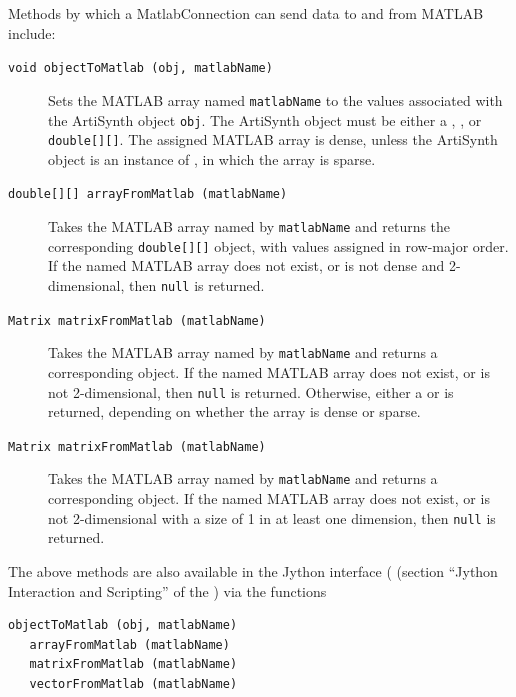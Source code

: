 \documentclass{article}
\begin{document}
Methods by which a MatlabConnection can send data to and from MATLAB
include:

\begin{description}

\item[{\tt void objectToMatlab (obj, matlabName)} ] \mbox{}

Sets the MATLAB array named {\tt matlabName} to the values associated
with the ArtiSynth object {\tt obj}. The ArtiSynth object must be
either a ,
, or {\tt double[][]}.  The assigned MATLAB
array is dense, unless the ArtiSynth object is an instance of
, in which the array
is sparse.

\item[{\tt double[][] arrayFromMatlab (matlabName)}] \mbox{}

Takes the MATLAB array named by {\tt matlabName} and returns the
corresponding {\tt double[][]} object, with values assigned in
row-major order. If the named MATLAB array does not exist, or is not
dense and 2-dimensional, then {\tt null} is returned.

\item[{\tt Matrix matrixFromMatlab (matlabName)}] \mbox{}

Takes the MATLAB array named by {\tt matlabName} and returns a
corresponding  object.  If the named
MATLAB array does not exist, or is not 2-dimensional, then {\tt null}
is returned. Otherwise, either a 
or  is returned, depending
on whether the array is dense or sparse.

\item[{\tt Matrix matrixFromMatlab (matlabName)}] \mbox{}

Takes the MATLAB array named by {\tt matlabName} and returns a
corresponding  object.  If the
named MATLAB array does not exist, or is not 2-dimensional with a size
of 1 in at least one dimension, then {\tt null} is returned.

\end{description}

The above methods are also available in the Jython interface (
(section ``Jython Interaction and Scripting'' of the
) via the functions
%
\begin{lstlisting}[]
   objectToMatlab (obj, matlabName)
   arrayFromMatlab (matlabName)
   matrixFromMatlab (matlabName)
   vectorFromMatlab (matlabName)
\end{lstlisting}
%
\end{document}
